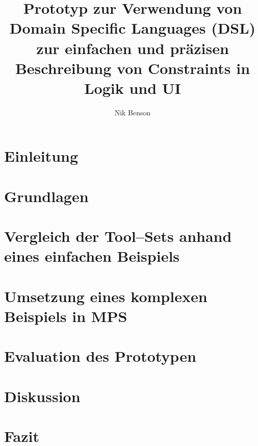 \documentclass[12pt]{article}
\title{Prototyp zur Verwendung von Domain Specific Languages (DSL) zur einfachen und präzisen Beschreibung von Constraints in Logik und UI}
\author{Nik Benson}
\affil{\href{mailto:nik.benson@studmail.w-hs.de}{nik.benson@studmail.w-hs.de}}
\begin{document}
    

    


    \section{Einleitung}\label{sec:einleitung}
    


    \section{Grundlagen}\label{sec:grundlagen}
    


    \section{Vergleich der Tool--Sets anhand eines einfachen Beispiels}\label{sec:vergleich-der-tool-sets-anhand-eines-einfachen-beispiels}
    


    \section{Umsetzung eines komplexen Beispiels in \acs{MPS}}\label{sec:umsetzung-eines-komplexen-beispiels-in-mps}
    


    \section{Evaluation des Prototypen}\label{sec:evaluation-des-prototypen}
    


    \section{Diskussion}\label{sec:diskussion}
    


    \section{Fazit}\label{sec:fazit}
    

    

    
\end{document}
